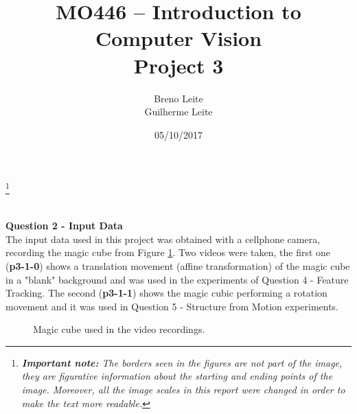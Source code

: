 \documentclass[12pt,a4paper]{article}
\title{MO446 -- Introduction to Computer Vision  \\ Project 3}
\author{Breno Leite  \\ Guilherme Leite}
\date{05/10/2017}
\newcommand\blfootnote[1]{%
	\begingroup
	\renewcommand\thefootnote{}\footnote{#1}%
	\addtocounter{footnote}{-1}%
	\endgroup
}
\begin{document}
\maketitle
\blfootnote{\textit{\textbf{Important note:} The borders seen in the figures are not part of the image, they are figurative information about the starting and ending points of the image. Moreover, all the image scales in this report were changed in order to make the text more readable.}} \\


\textbf{\LARGE Question 2 - Input Data} \\

The input data used in this project was obtained with a cellphone camera,  recording the magic cube from Figure \ref{fig:magicCube}. Two videos were taken, the first one (\textbf{p3-1-0}) shows a translation movement (affine transformation) of the magic cube in a "blank" background and was used in the experiments of Question 4 - Feature Tracking. The second (\textbf{p3-1-1}) shows the magic cubic performing a rotation movement and it was used in Question 5 - Structure from Motion experiments. \\

\begin{figure}[!h]
	\centering
	{
		\setlength{\fboxsep}{1pt}
		\setlength{\fboxrule}{1pt}
	}
	\caption{Magic cube used in the video recordings.}
	\label{fig:magicCube}
\end{figure}
\end{document}
